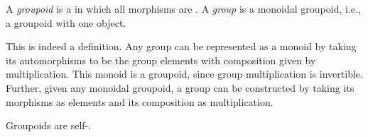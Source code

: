


\begin{dfn*}\label{cat:groupoid}
	A \emph{groupoid} is a  in which all morphisms are
	. A \emph{group} is a monoidal groupoid, i.e., a
	groupoid with one object.
\end{dfn*}

This is indeed a definition. Any group can be represented as a monoid by taking
its automorphisms to be the group elements with composition given by
multiplication. This monoid is a groupoid, since group multiplication is
invertible. Further, given any monoidal groupoid, a group can be constructed by
taking its morphisms as elements and its composition as multiplication.

Groupoids are self-.


